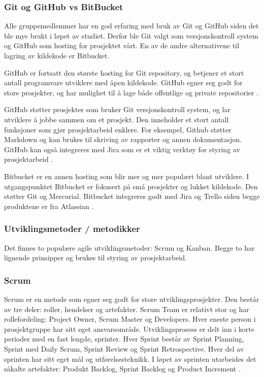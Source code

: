 \subsubsection*{Git og GitHub vs BitBucket}

Alle gruppemedlemmer har en god erfaring med bruk av Git og GitHub siden det ble mye brukt i løpet av studiet. Derfor ble Git valgt som versjonskontroll system og GitHub som hosting for prosjektet vårt. En av de andre alternativene til lagring av kildekode er Bitbucket.

GitHub er fortsatt den største hosting for Git repository, og betjener et stort antall programvare utviklere med åpen kildekode. GitHub egner seg godt for store prosjekter, og har mulighet til å lage både offentlige og private repositorier \cite{4-geeksforgeeks.org}.

GitHub støtter prosjekter som bruker Git versjonskontroll system, og lar utviklere å jobbe sammen om et prosjekt. Den inneholder et stort antall funksjoner som gjør prosjektarbeid enklere. For eksempel, Github støtter Markdown og kan brukes til skriving av rapporter og annen dokumentasjon. GitHub kan også integreres med Jira som er et viktig verktøy for styring av prosjektarbeid \cite{4-geeksforgeeks.org}.

Bitbucket er en annen hosting som blir mer og mer populært blant utviklere. I utgangspunktet Bitbucket er fokusert på små prosjekter og lukket kildekode. Den støtter Git og Mercurial. Bitbucket integreres godt med Jira og Trello siden begge produktene er fra Atlassian \cite{4-geeksforgeeks.org}.

\subsubsection{Utviklingsmetoder / metodikker}

Det finnes to populære agile utviklingsmetoder: Scrum og Kanban. Begge to har lignende prinsipper og brukes til styring av prosjektarbeid.

\subsubsection*{Scrum}

Scrum er en metode som egner seg godt for store utviklingsprosjekter. Den består av tre deler: roller, hendelser og artefakter. Scrum Team er relativt stor og har rollefordeling: Project Owner, Scrum Master og Developers. Hver eneste person i prosjektgruppe har sitt eget ansvarsområde. Utviklingsprosess er delt inn i korte perioder med en fast lengde, sprinter. Hver Sprint består av Sprint Planning, Sprint med Daily Scrum, Sprint Review og Sprint Retrospective. Hver del av sprinten har sitt eget mål og utførelsesteknikk. I løpet av sprinten utarbeides det såkalte artefakter: Produkt Backlog, Sprint Backlog og Product Increment \cite{4-atlassian.com-kanban-vs-scrum}. 

